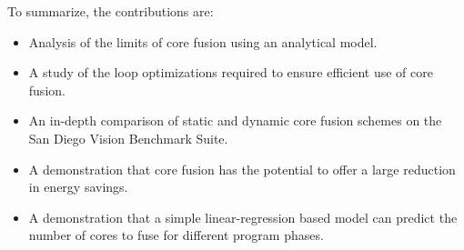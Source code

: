 To summarize, the contributions are:

\begin{itemize}
\item Analysis of the limits of core fusion using an analytical model.
\vspace{-1em}
\item A study of the loop optimizations required to ensure efficient use of core fusion.
\vspace{-2.5em}
\item An in-depth comparison of static and dynamic core fusion schemes on the San Diego Vision Benchmark Suite.
\vspace{-1em}
\item A demonstration that core fusion has the potential to offer a large reduction in energy savings.
\vspace{-1em}
\item A demonstration that a simple linear-regression based model can predict the number of cores to fuse for different program phases.
\end{itemize}




